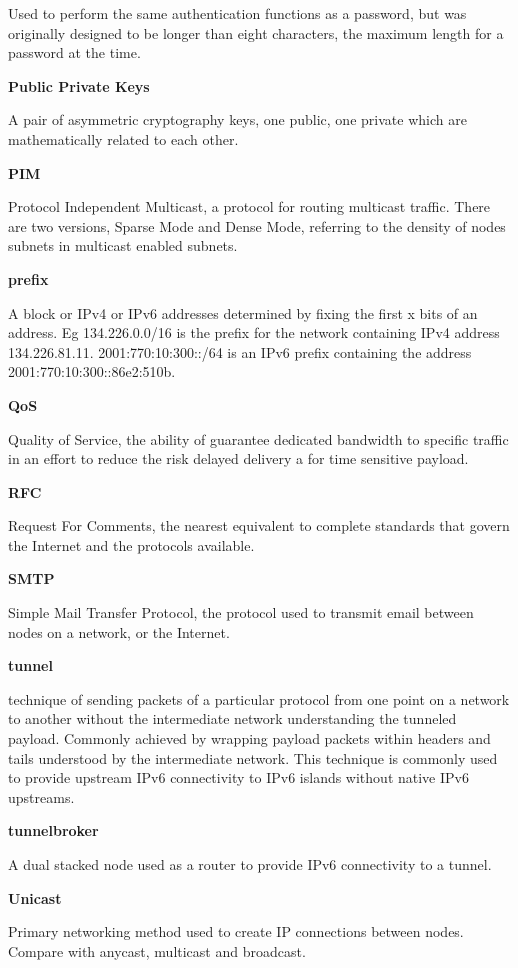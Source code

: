 Used to perform the same authentication functions as a password, but was
originally designed to be longer than eight characters, the maximum
length for a password at the time.

\textbf{Public Private Keys}

A pair of asymmetric cryptography keys, one public, one private which 
are mathematically related to each other. 

\textbf{PIM}

Protocol Independent Multicast, a protocol for routing multicast
traffic. There are two versions, Sparse Mode and Dense Mode, referring
to the density of nodes subnets in multicast enabled subnets.

\textbf{prefix}

A block or IPv4 or IPv6 addresses determined by fixing the first x bits
of an address. Eg 134.226.0.0/16 is the prefix for the network
containing IPv4 address 134.226.81.11. 2001:770:10:300::/64 is an IPv6
prefix containing the address 2001:770:10:300::86e2:510b. 

\textbf{QoS}

Quality of Service, the ability of guarantee dedicated bandwidth to
specific traffic in an effort to reduce the risk delayed delivery a for
time sensitive payload.

\textbf{RFC}

Request For Comments, the nearest equivalent to complete standards that
govern the Internet and the protocols available.

\textbf{SMTP}

Simple Mail Transfer Protocol, the protocol used to transmit email
between nodes on a network, or the Internet.

\textbf{tunnel}

technique of sending packets of a particular protocol from one point on
a network to another without the intermediate network understanding the
tunneled payload. Commonly achieved by wrapping payload packets within
headers and tails understood by the intermediate network. This
technique is commonly used to provide upstream IPv6 connectivity to IPv6
islands without native IPv6 upstreams.

\textbf{tunnelbroker}

A dual stacked node used as a router to provide IPv6 connectivity to a
tunnel.

\textbf{Unicast}

Primary networking method used to create IP connections between nodes.
Compare with anycast, multicast and broadcast.

